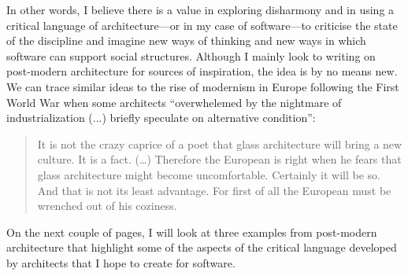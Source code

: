 In other words, I believe there is a value in exploring disharmony and in using a critical language of architecture---or in my case of software---to
criticise the state of the discipline and imagine new ways of thinking and new ways in which
software can support social structures.
Although I mainly look to writing on post-modern architecture for sources of inspiration,
the idea is by no means new. We can trace similar ideas to the rise of modernism in Europe
following the First World War when some architects ``overwhelemed by the nightmare of
industrialization (...) briefly speculate on alternative condition'':

\begin{quote}
It is not the crazy caprice of a poet that glass architecture will bring a new culture.
It is a fact. (\ldots) Therefore the European is right when he fears that glass architecture
might become uncomfortable. Certainly it will be so. And that is not its least advantage.
For first of all the European must be wrenched out of his coziness.
\end{quote}

On the next couple of pages, I will look at three examples from post-modern architecture that
highlight some of the aspects of the critical language developed by architects that I hope
to create for software.

\newpage

